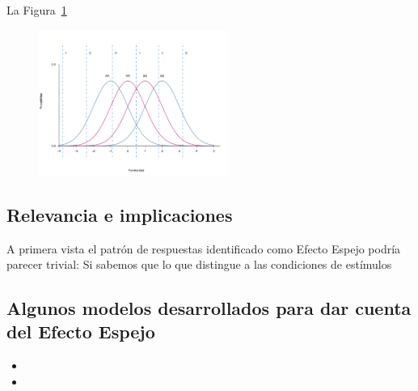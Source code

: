 La Figura~\ref{fig:Ejem_Crit} 

\begin{figure}[th]
\centering
\includegraphics[width=0.55\textwidth]{Figures/Ejem_Criterios}
\caption[Representación gráfica de los sub-Criterios para la emisión de puntajes de confianza ]{}
\label{fig:Ejem_Crit}
\end{figure}



\subsection{Relevancia e implicaciones}
A primera vista el patrón de respuestas identificado como Efecto Espejo podría parecer trivial: Si sabemos que lo que distingue a las condiciones de estímulos 

\subsection{Algunos modelos desarrollados para dar cuenta del Efecto Espejo}

\begin{itemize} 
\item
\item
\end{itemize}


